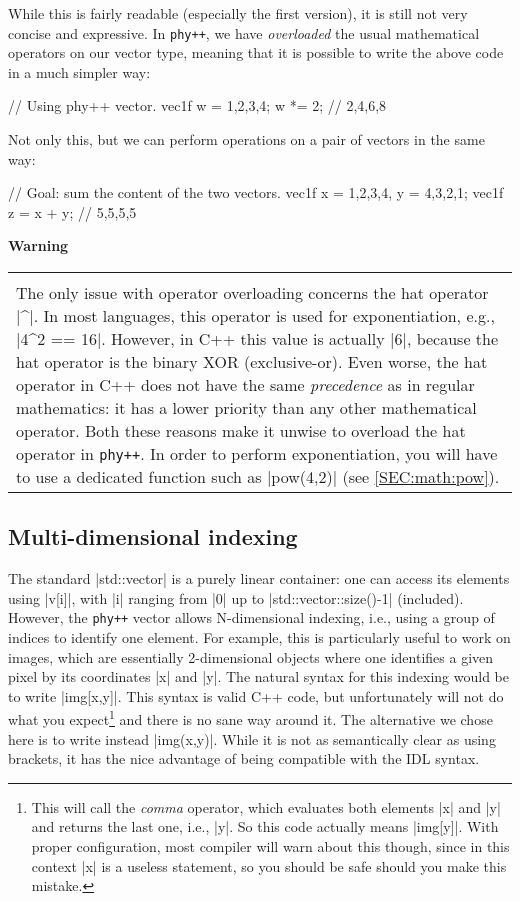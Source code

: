 \documentclass[12pt]{report}
\newcommand{\phypp}{\texttt{phy++}\xspace}
\newcommand{\stdvec}{\cppinline|std::vector|\xspace}
\newenvironment{warning}
{
    \vspace{0.3cm}\noindent \textbf{\color{blue} Warning} \\
    \noindent\begin{tabular}{p{0.95\textwidth}}
    \hline\\[-0.3cm]
}
{
    \\[0.2cm]\hline
    \end{tabular}
}
\begin{document}
While this is fairly readable (especially the first version), it is still not very concise and expressive. In \phypp, we have \emph{overloaded} the usual mathematical operators on our vector type, meaning that it is possible to write the above code in a much simpler way:

\begin{cppcode}
// Using phy++ vector.
vec1f w = {1,2,3,4};
w *= 2; // {2,4,6,8}
\end{cppcode}

Not only this, but we can perform operations on a pair of vectors in the same way:
\begin{cppcode}
// Goal: sum the content of the two vectors.
vec1f x = {1,2,3,4}, y = {4,3,2,1};
vec1f z = x + y; // {5,5,5,5}
\end{cppcode}

\begin{warning}
The only issue with operator overloading concerns the hat operator \cppinline|^|. In most languages, this operator is used for exponentiation, e.g., \cppinline|4^2 == 16|. However, in C++ this value is actually \cppinline|6|, because the hat operator is the binary XOR (exclusive-or). Even worse, the hat operator in C++ does not have the same \emph{precedence} as in regular mathematics: it has a lower priority than any other mathematical operator. Both these reasons make it unwise to overload the hat operator in \phypp. In order to perform exponentiation, you will have to use a dedicated function such as \cppinline|pow(4,2)| (see \ref{SEC:math:pow}).
\end{warning}

\subsection{Multi-dimensional indexing \label{SEC:core:overview:multidim}}

The standard \stdvec is a purely linear container: one can access its elements using \cppinline|v[i]|, with \cppinline|i| ranging from \cppinline|0| up to \cppinline|std::vector::size()-1| (included). However, the \phypp vector allows N-dimensional indexing, i.e., using a group of indices to identify one element. For example, this is particularly useful to work on images, which are essentially 2-dimensional objects where one identifies a given pixel by its coordinates \cppinline|x| and \cppinline|y|. The natural syntax for this indexing would be to write \cppinline|img[x,y]|. This syntax is valid C++ code, but unfortunately will not do what you expect\footnote{This will call the \emph{comma} operator, which evaluates both elements \cppinline|x| and \cppinline|y| and returns the last one, i.e., \cppinline|y|. So this code actually means \cppinline|img[y]|. With proper configuration, most compiler will warn about this though, since in this context \cppinline|x| is a useless statement, so you should be safe should you make this mistake.} and there is no sane way around it. The alternative we chose here is to write instead \cppinline|img(x,y)|. While it is not as semantically clear as using brackets, it has the nice advantage of being compatible with the IDL syntax.
\end{document}
